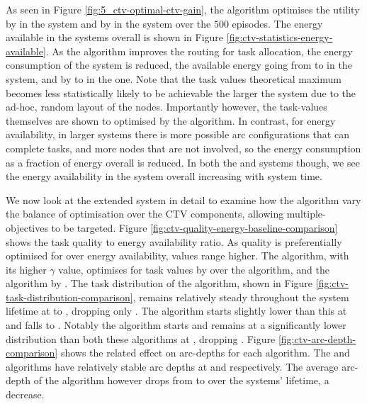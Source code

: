 As seen in Figure \ref{fig:5_ctv-optimal-ctv-gain}, the \algorithmBalanced{}{} algorithm optimises the utility by \resultsCTVBalancedDiff{}{}  in the \simulationSimple{}{} system and by \resultsCTVBalancedExtDiff{}{} in the \simulationExtended{}{} system over the $500$ episodes. The energy available in the systems overall is shown in Figure \ref{fig:ctv-statistics-energy-available}. As the algorithm improves the routing for task allocation, the energy consumption of the system is reduced, the available energy going from \resultsEnergyBalancedStart{}{} to \resultsEnergyBalancedEnd{}{} in the \simulationSimple{}{} system, and by \resultsEnergyBalancedExtStart{}{} to \resultsEnergyBalancedExtEnd{}{} in the \simulationExtended{}{} one. Note that the task values theoretical maximum becomes less statistically likely to be achievable the larger the system due to the ad-hoc, random layout of the nodes. Importantly however, the task-values themselves are shown to optimised by the algorithm. In contrast, for energy availability, in larger systems there is more possible arc configurations that can complete tasks, and more nodes that are not involved, so the  energy consumption as a fraction of energy overall is reduced. In both the \simulationSimple{}{} and \simulationExtended{}{} systems though, we see the energy availability in the system overall increasing with system time.

We now look at the extended system in detail to examine how the algorithm vary the balance  of optimisation over the CTV components, allowing multiple-objectives to be targeted. Figure 	\ref{fig:ctv-quality-energy-baseline-comparison} shows the task quality to energy availability ratio. 
As quality is preferentially optimised for over energy availability, values range higher. The \algorithmQuality{}{} algorithm, with its higher $\gamma$ value, optimises for task values by \resultsQEQualityEnd{}{} over the \algorithmEnergy{}{} algorithm, and the \algorithmDistribution{}{} algorithm by \resultsQEDistDiff{}{}. The task distribution of the \algorithmDistribution{}{} algorithm, shown in Figure 	\ref{fig:ctv-task-distribution-comparison}, remains relatively steady throughout the system lifetime at \resultsTaskDistDistStart{}{} to \resultsTaskDistDistEnd{}{}, dropping only \resultsTaskDistDistPercent{}{}. The \algorithmQuality{}{} algorithm starts slightly lower than this at \resultsTaskDistQualityStart{}{} and falls \resultsTaskDistQualityPercent{}{} to \resultsTaskDistQualityEnd{}{}. Notably the \algorithmEnergy{}{} algorithm starts and remains at a significantly lower distribution than both these algorithms at \resultsTaskDistEnergyEnd{}{}, dropping \resultsTaskDistEnergydPercent{}{}. Figure
\ref{fig:ctv-arc-depth-comparison} shows the related effect on arc-depths for each algorithm. The \algorithmQuality{}{} and \algorithmDistribution{}{} algorithms have relatively stable arc depths at \resultsArcDepthQualityEnd{}{} and \resultsArcDepthDistEnd{}{} respectively. The average arc-depth of the \algorithmEnergy{}{} algorithm however drops from \resultsArcDepthEnergyStart{}{} to  \resultsArcDepthEnergyEnd{}{} over the systems' lifetime, a \resultsArcDepthEnergyPercent{}{} decrease.

